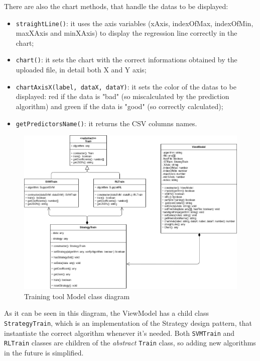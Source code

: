 There are also the chart methods, that handle the datas to be displayed: \begin{itemize}
\item \texttt{straightLine()}: it uses the axis variables (xAxis, indexOfMax, indexOfMin, maxXAxis and minXAxis) to display the regression line correctly in the chart;
\item \texttt{chart()}: it sets the chart with the correct informations obtained by the uploaded file, in detail both X and Y axis;
\item \texttt{chartAxisX(label, dataX, dataY)}: it sets the color of the datas to be displayed: red if the data is "bad" (so miscalculated by the prediction algorithm) and green if the data is "good" (so correctly calculated);
\item \texttt{getPredictorsName()}: it returns the CSV columns names.
\end{itemize}

\begin{figure}[H]
\centering
\includegraphics[scale=0.45]{../../../Diagrams/Classes_diagrams/tool_modelview.png}
\caption{Training tool Model class diagram}
\end{figure}

As it can be seen in this diagram, the ViewModel has a child class \texttt{StrategyTrain}, which is an implementation of the Strategy design pattern, that instantiate the correct algorithm whenever it's needed. Both \texttt{SVMTrain} and \texttt{RLTrain} classes are children of the \textit{abstract} \texttt{Train} class, so adding new algorithms in the future is simplified.

